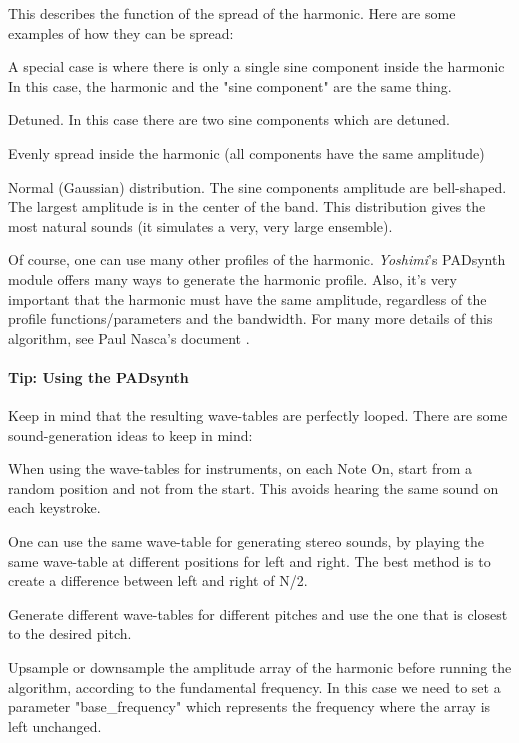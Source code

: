    This describes the function of the spread of the harmonic.
   Here are some examples of how they can be spread:

   \begin{enumber}
      \item  A special case is where there is only a single sine component
         inside the harmonic In this case, the harmonic and the "sine
         component" are the same thing.
      \item  Detuned. In this case there are two sine components which are
         detuned.
      \item  Evenly spread inside the harmonic (all components have the same
         amplitude)
      \item  Normal (Gaussian) distribution. The sine components amplitude are
         bell-shaped. The largest amplitude is in the center of the band. This
         distribution gives the most natural sounds (it simulates a very, very
         large ensemble).
   \end{enumber}

   Of course, one can use many other profiles of the harmonic.
   \textsl{Yoshimi}'s PADsynth module offers many ways to generate the
   harmonic profile.  Also, it's very important that the harmonic must have the
   same amplitude, regardless of the profile functions/parameters and the
   bandwidth.
   For many more details of this algorithm, see Paul Nasca's document
   \cite{zyndoc}.

\paragraph{Tip: Using the PADsynth}
\label{tips_using_the_padsynth}

   Keep in mind that the resulting wave-tables are perfectly looped.
   There are some sound-generation ideas to keep in mind:

   \begin{enumber}
      \item When using the wave-tables for instruments, on each Note On, start
         from a random position and not from the start. This avoids hearing the
         same sound on each keystroke.
      \item One can use the same wave-table for generating stereo sounds, by
         playing the same wave-table at different positions for left and right.
         The best method is to create a difference between left and
         right of N/2.
      \item Generate different wave-tables for different pitches and use the
         one that is closest to the desired pitch.
      \item Upsample or downsample the amplitude array of the harmonic before
         running the algorithm, according to the fundamental frequency. In this
         case we need to set a parameter "base\_frequency" which represents the
         frequency where the array is left unchanged.
   \end{enumber}

